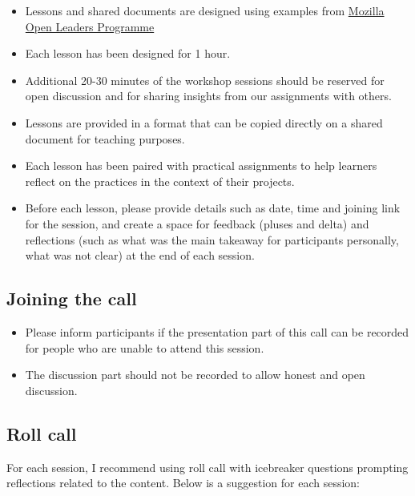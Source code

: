 \documentclass[
  letterpaper,
  DIV=11,
  numbers=noendperiod]{scrreport}
\providecommand{\tightlist}{%
  \setlength{\itemsep}{0pt}\setlength{\parskip}{0pt}}\usepackage{longtable,booktabs,array}
\begin{document}
\begin{itemize}
\tightlist
\item
  Lessons and shared documents are designed using examples from
  \href{https://foundation.mozilla.org/en/initiatives/mozilla-open-leaders/}{Mozilla
  Open Leaders Programme}
\item
  Each lesson has been designed for 1 hour.
\item
  Additional 20-30 minutes of the workshop sessions should be reserved
  for open discussion and for sharing insights from our assignments with
  others.
\item
  Lessons are provided in a format that can be copied directly on a
  shared document for teaching purposes.
\item
  Each lesson has been paired with practical assignments to help
  learners reflect on the practices in the context of their projects.
\item
  Before each lesson, please provide details such as date, time and
  joining link for the session, and create a space for feedback (pluses
  and delta) and reflections (such as what was the main takeaway for
  participants personally, what was not clear) at the end of each
  session.
\end{itemize}

\hypertarget{joining-the-call}{%
\subsection{Joining the call}\label{joining-the-call}}

\begin{itemize}
\tightlist
\item
  Please inform participants if the presentation part of this call can
  be recorded for people who are unable to attend this session.
\item
  The discussion part should not be recorded to allow honest and open
  discussion.
\end{itemize}

\hypertarget{roll-call}{%
\subsection{Roll call}\label{roll-call}}

For each session, I recommend using roll call with icebreaker questions
prompting reflections related to the content. Below is a suggestion for
each session:
\end{document}
